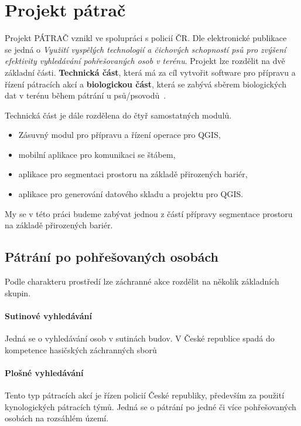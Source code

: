 \chapter{Projekt pátrač} 
\label{chap:searchandrescue}

	Projekt PÁTRAČ vznikl ve spolupráci s policií ČR. Dle elektronické publikace~\cite{chaloupkova2017vyuziti} se jedná o \textit{Využití vyspělých technologií a čichových schopností psů pro zvýšení efektivity vyhledávání pohřešovaných osob v terénu}. Projekt lze rozdělit na dvě základní části. \textbf{Technická část}, která má za cíl vytvořit software pro přípravu a řízení pátracích akcí a \textbf{biologickou část}, která se zabývá sběrem biologických dat v terénu během pátrání u psů/psovodů~\cite{Zeman2009thesis}.
	
	Technická část je dále rozdělena do čtyř samostatných modulů.
\begin{itemize}
	\item Zásuvný modul pro přípravu a řízení operace pro QGIS,
	\item mobilní aplikace pro komunikaci se štábem,
	\item aplikace pro segmentaci prostoru na základě přirozených bariér,
	\item aplikace pro generování datového skladu a projektu pro QGIS.
\end{itemize}	
My se v této práci budeme zabývat jednou z částí přípravy segmentace prostoru na základě přirozených bariér. 

\section{Pátrání po pohřešovaných osobách}
	Podle charakteru prostředí lze záchranné akce rozdělit na několik základních skupin.
	
\subsubsection{Sutinové vyhledávání}
	Jedná se o vyhledávání osob v sutinách budov. V České republice spadá do kompetence hasičských záchranných sborů
	
\subsubsection{Plošné vyhledávání}
	Tento typ pátracích akcí je řízen policií České republiky, především za použití kynologických pátracích týmů. Jedná se o pátrání po jedné či více pohřešovaných osobách na rozsáhlém území. 

